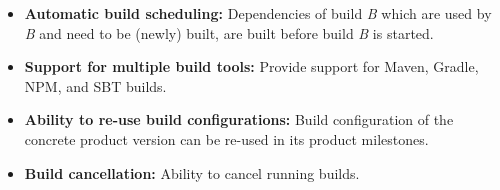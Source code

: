 \documentclass[../main.tex]{subfiles}
\begin{document}
\begin{itemize}
\begin{enumerate}
      \item \textbf{No later modification guarantee:} any artifact with a Red Hat version cannot be changed later. In other words, once the uniquely identified artifact is produced (e.g.\\
      \textit{org.foo:bar:1.0.redhat-00001}) its hash remains the same for its whole lifecycle.\\
      \textbf{Note:} This helps with \textbf{build reproducibility} discussed previously.
  \end{enumerate}

  \textbf{Example:} Example of version increment together with dependency alignment is shown in Figure \ref{fig:alignment}.

\begin{figure}
  \begin{center}
    \texttt{[image: images/alignment.png]}
  \end{center}
  \caption{Example alignment of maven build}
  \label{fig:alignment}
\end{figure}

  \item \textbf{Automatic build scheduling:} Dependencies of build \textit{B} which are used by \textit{B} and need to be (newly) built, are built before build \textit{B} is started.

  \item \textbf{Support for multiple build tools:} Provide support for Maven, Gradle, NPM, and SBT builds.

  \item \textbf{Ability to re-use build configurations:} Build configuration of the concrete product version can be re-used in its product milestones.

  \item \textbf{Build cancellation:} Ability to cancel running builds.

\end{itemize}
\end{document}
